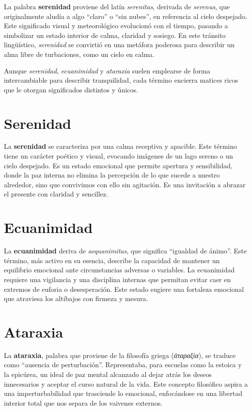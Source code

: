 \documentclass[
]{book}
\begin{document}
La palabra \textbf{serenidad} proviene del latín \emph{serenitas}, derivada de \emph{serenus}, que originalmente aludía a algo ``claro'' o ``sin nubes'', en referencia al cielo despejado. Este significado visual y meteorológico evolucionó con el tiempo, pasando a simbolizar un estado interior de calma, claridad y sosiego. En este tránsito lingüístico, \emph{serenidad} se convirtió en una metáfora poderosa para describir un alma libre de turbaciones, como un cielo en calma.

Aunque \emph{serenidad}, \emph{ecuanimidad} y \emph{ataraxia} suelen emplearse de forma intercambiable para describir tranquilidad, cada término encierra matices ricos que le otorgan significados distintos y únicos.

\section{Serenidad}\label{serenidad}

La \textbf{serenidad} se caracteriza por una calma receptiva y apacible. Este término tiene un carácter poético y visual, evocando imágenes de un lago sereno o un cielo despejado. Es un estado emocional que permite apertura y sensibilidad, donde la paz interna no elimina la percepción de lo que sucede a nuestro alrededor, sino que convivimos con ello sin agitación. Es una invitación a abrazar el presente con claridad y sencillez.

\section{Ecuanimidad}\label{ecuanimidad}

La \textbf{ecuanimidad} deriva de \emph{aequanimitas}, que significa ``igualdad de ánimo''. Este término, más activo en su esencia, describe la capacidad de mantener un equilibrio emocional ante circunstancias adversas o variables. La ecuanimidad requiere una vigilancia y una disciplina internas que permitan evitar caer en extremos de euforia o desesperación. Este estado sugiere una fortaleza emocional que atraviesa los altibajos con firmeza y mesura.

\section{Ataraxia}\label{ataraxia}

La \textbf{ataraxia}, palabra que proviene de la filosofía griega (\emph{ἀταραξία}), se traduce como ``ausencia de perturbación''. Representaba, para escuelas como la estoica y la epicúrea, un ideal de paz mental alcanzado al dejar atrás los deseos innecesarios y aceptar el curso natural de la vida. Este concepto filosófico aspira a una imperturbabilidad que trasciende lo emocional, enfocándose en una libertad interior total que nos separa de los vaivenes externos.
\end{document}
